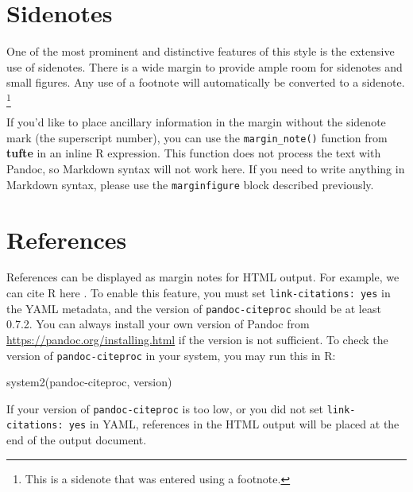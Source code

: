 \documentclass[a4paper,14pt]{tufte-handout}
\newenvironment{Shaded}{}{}
\newcommand{\FunctionTok}[1]{\textcolor[rgb]{0.02,0.16,0.49}{#1}}
\newcommand{\NormalTok}[1]{#1}
\newcommand{\StringTok}[1]{\textcolor[rgb]{0.25,0.44,0.63}{#1}}
\begin{document}
\hypertarget{sidenotes}{%
\section{Sidenotes}\label{sidenotes}}

One of the most prominent and distinctive features of this style is the
extensive use of sidenotes. There is a wide margin to provide ample room
for sidenotes and small figures. Any use of a footnote will
automatically be converted to a sidenote. \footnote{This is a sidenote
  that was entered using a footnote.}

If you'd like to place ancillary information in the margin without the
sidenote mark (the superscript number), you can use the
\texttt{margin\_note()} function from \textbf{tufte} in an inline R
expression.
This function does not process the text with Pandoc, so Markdown syntax
will not work here. If you need to write anything in Markdown syntax,
please use the \texttt{marginfigure} block described previously.

\hypertarget{references}{%
\section{References}\label{references}}

References can be displayed as margin notes for HTML output. For
example, we can cite R here \citep{R-base}. To enable this feature, you
must set \texttt{link-citations:\ yes} in the YAML metadata, and the
version of \texttt{pandoc-citeproc} should be at least 0.7.2. You can
always install your own version of Pandoc from
\url{https://pandoc.org/installing.html} if the version is not
sufficient. To check the version of \texttt{pandoc-citeproc} in your
system, you may run this in R:

\begin{Shaded}
\begin{Highlighting}[numbers=left,,]
\FunctionTok{system2}\NormalTok{(}\StringTok{\textquotesingle{}pandoc{-}citeproc\textquotesingle{}}\NormalTok{, }\StringTok{\textquotesingle{}{-}{-}version\textquotesingle{}}\NormalTok{)}
\end{Highlighting}
\end{Shaded}

If your version of \texttt{pandoc-citeproc} is too low, or you did not
set \texttt{link-citations:\ yes} in YAML, references in the HTML output
will be placed at the end of the output document.
\end{document}
